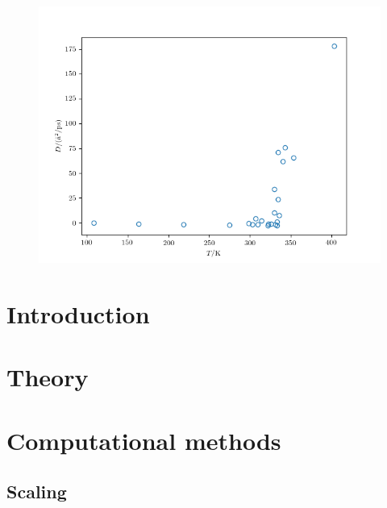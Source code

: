 \documentclass[fleqn]{scrartcl}
\begin{document}
	\title{}
	\subtitle{\url{https://github.com/sverl/FYS3150-FYS4150}}
	\author{Sverre Løyland}
	\maketitle
	
	\begin{abstract}
		
	\end{abstract}

	
	\begin{figure}
		\centering
		
		\caption{}
		\label{fig:flowchart}	
	\end{figure}

	\begin{figure}
		\centering
		\includegraphics{melt.png}
		\caption{}
		\label{fig:melt}	
	\end{figure}

	\section{Introduction}
	
	
	\section{Theory}
	

	\section{Computational methods}
	
	\subsection{Scaling}
\end{document}
